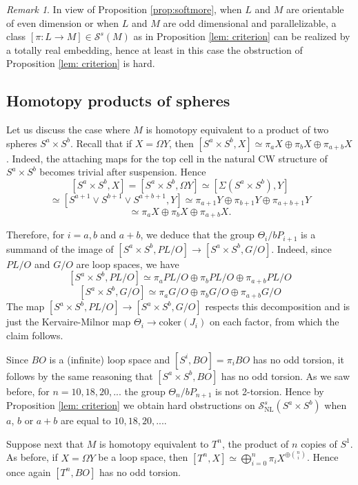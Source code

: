 \documentclass[reqno]{amsart}
\theoremstyle{theorem}
\theoremstyle{remark}
\newtheorem{remark}[corollary]{Remark}
\theoremstyle{definition}
\newcommand{\NL}{\mathrm{NL}}
\renewcommand{\SS}{\mathcal{S}}
\begin{document}
\begin{remark}\label{remark: hard}
  In view of Proposition \ref{prop:softmore}, when $L$ and $M$ are orientable of even dimension or when $L$ and $M$ are odd dimensional and parallelizable, a class $[\pi:L \to M] \in \SS^s(M)$ as in Proposition \ref{lem: criterion} can be realized by a totally real embedding, hence at least in this case the obstruction of Proposition \ref{lem: criterion} is hard.
\end{remark}



\subsection{Homotopy products of spheres}
Let us discuss the case where $M$ is homotopy equivalent to a product of two spheres $S^a \times S^b$. Recall that if $X=\Omega Y$, then $[S^a \times S^b, X] \simeq \pi_a X \oplus \pi_b X \oplus \pi_{a+b} X$. Indeed, the attaching maps for the top cell in the natural CW structure of $S^a \times S^b$ becomes trivial after suspension. Hence
\[ [S^a \times  S^b , X]  = [S^a \times  S^b , \Omega Y]  \simeq [ \Sigma \left(S^a \times S^b\right) , Y] \]
\[ \simeq [S^{a+1} \lor S^{b+1} \lor S^{a+b+1}, Y]  \simeq \pi_{a+1} Y \oplus \pi_{b+1}Y \oplus \pi_{a+b+1}Y \]
\[ \simeq \pi_a X \oplus \pi_b X \oplus \pi_{a+b} X . \]


Therefore, for $i=a, b$ and $a+b$, we deduce that the group $\Theta_i / bP_{i+1}$ is a summand of the image of $[S^a \times S^b, PL/O] \to [S^a \times S^b, G/O]$. Indeed, since $PL/O$ and $G/O$ are loop spaces,  we have
\[ [S^a \times S^b , PL/O] \simeq  \pi_a PL/O \oplus \pi_b PL/O \oplus \pi_{a+b} PL/O \] 
\[ [S^a \times S^b , G/O] \simeq  \pi_a G/O \oplus \pi_b G/O \oplus \pi_{a+b} G/O \]  
The map $[S^a \times S^b , PL/O] \to [S^a \times S^b , G/O]$ respects this decomposition and is just the Kervaire-Milnor map $\Theta_i \to \text{coker}(J_i)$ on each factor, from which the claim follows.


Since $BO$ is a (infinite) loop space and $[S^i , BO] = \pi_i BO$ has no odd torsion, it follows by the same reasoning that $[S^a \times S^b, BO]$ has no odd torsion. As we saw before, for $n=10,18,20,...$ the group $\Theta_n / bP_{n+1}$ is not 2-torsion. Hence by Proposition \ref{lem: criterion} we obtain hard obstructions on $\SS^s_\NL(S^a \times S^b)$ when $a$, $b$ or $a+b$ are equal to $10,18,20,...$.




Suppose  next that $M$ is homotopy equivalent to $T^n$, the product of $n$ copies of $S^1$. As before, if $X=\Omega Y$ be a loop space, then $[T^n, X] \simeq \bigoplus_{i=0}^n \pi_iX^{\oplus {n \choose i}}$. Hence once again $[T^n, BO]$ has no odd torsion. 
\end{document}
